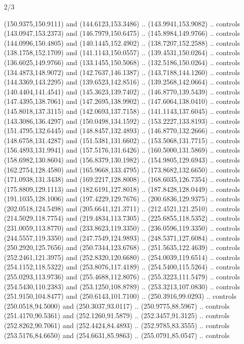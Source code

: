 \begin{flagdescription}{2/3}
\begin{scope}[xshift=0.5\flaglength,yshift=0.5\flagwidth,scale=\flagwidth/240]
\begin{scope}[y=0.8pt, x=0.8pt, yscale=-1,shift={(-225.0,-150)}]
  (150.9375,150.9111) and (144.6123,153.3486) .. (143.9941,153.9082) .. controls
  (143.0947,153.2373) and (146.7979,150.6475) .. (145.8984,149.9766) .. controls
  (144.0996,150.4805) and (140.1445,152.4902) .. (138.7207,152.2588) .. controls
  (138.1758,152.1709) and (141.1143,150.0557) .. (139.4531,150.0264) .. controls
  (136.6025,149.9766) and (133.1455,150.5068) .. (132.5186,150.0264) .. controls
  (134.4873,148.9072) and (142.7637,146.1387) .. (143.7188,144.1260) .. controls
  (144.3369,143.2295) and (139.6523,142.8516) .. (139.2568,142.0664) .. controls
  (140.4404,141.4541) and (145.3623,139.7402) .. (146.8770,139.5439) .. controls
  (147.4395,138.7061) and (147.2695,138.9902) .. (147.6064,138.0410) .. controls
  (145.8018,137.3115) and (142.0693,137.7158) .. (141.1143,137.6045) .. controls
  (143.3086,136.4297) and (150.0498,134.1592) .. (153.2227,133.8193) .. controls
  (151.4795,132.6445) and (148.8457,132.4893) .. (146.8770,132.2666) .. controls
  (148.6758,131.4287) and (151.5381,131.6602) .. (153.5068,131.7715) .. controls
  (156.4893,131.9941) and (157.5176,131.6426) .. (160.5000,131.5869) .. controls
  (158.6982,130.8604) and (156.8379,130.1982) .. (154.9805,129.6943) .. controls
  (162.2754,128.4580) and (165.9668,133.4795) .. (173.8682,132.6650) .. controls
  (171.0938,131.3438) and (169.2217,128.8008) .. (168.6035,126.7354) .. controls
  (175.8809,129.1113) and (182.6191,127.8018) .. (187.8428,128.0449) .. controls
  (191.1035,128.1006) and (197.4229,129.7676) .. (200.6836,129.9375) .. controls
  (202.0518,124.5498) and (205.6641,121.3711) .. (212.4521,121.2510) .. controls
  (214.5029,118.7754) and (219.4834,113.7305) .. (225.6855,118.5352) .. controls
  (231.0059,113.8770) and (233.8623,119.3350) .. (236.0596,119.3350) .. controls
  (244.5557,119.3350) and (247.7549,124.9893) .. (248.5371,127.6084) .. controls
  (250.2920,125.7656) and (250.7344,123.6768) .. (251.5635,122.4639) .. controls
  (252.2461,121.3975) and (252.8320,120.6680) .. (254.0039,119.6514) .. controls
  (254.1152,118.5322) and (253.8076,117.4189) .. (254.5400,115.5264) .. controls
  (255.0293,113.9736) and (255.4688,112.8076) .. (255.3223,111.5479) .. controls
  (254.5430,110.2383) and (253.1250,108.8789) .. (253.3213,107.0830) .. controls
  (251.9150,104.8477) and (250.6143,101.7100) .. (250.3916,99.0293) .. controls
  (250.0518,94.5000) and (250.3037,93.0117) .. (250.9775,88.5967) .. controls
  (251.4170,90.5361) and (252.1260,91.5879) .. (252.3457,91.3125) .. controls
  (252.8262,90.7061) and (252.4424,84.4893) .. (252.9785,83.3555) .. controls
  (253.5176,84.6650) and (254.6631,85.9863) .. (255.0791,85.0547) .. controls

\end{scope}
\end{scope}
\end{flagdescription}
